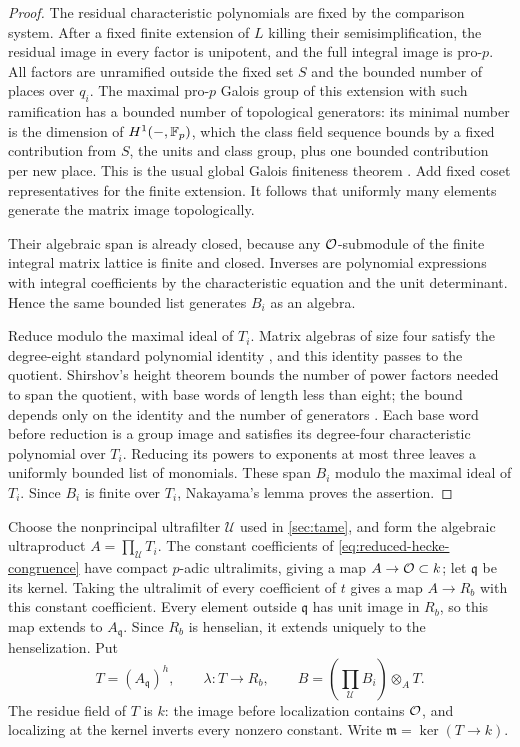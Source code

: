 \begin{proof}
The residual characteristic polynomials are fixed by the comparison
system.  After a fixed finite extension of $L$ killing their
semisimplification, the residual image in every factor is unipotent,
and the full integral image is pro-$p$.  All factors are unramified
outside the fixed set $S$ and the bounded number of places over
$q_i$.  The maximal pro-$p$ Galois group of this extension with such
ramification has a bounded number of topological generators: its
minimal number is the dimension of $H^1(-,\mathbb F_p)$, which the class
field sequence bounds by a fixed contribution from $S$, the units
and class group, plus one bounded contribution per new place.
This is the usual global Galois finiteness theorem
\citep[Chapter X]{NSW2008}.  Add fixed coset representatives for the
finite extension.  It follows that uniformly many elements generate
the matrix image topologically.

Their algebraic span is already closed, because any $\mathcal O$-submodule
of the finite integral matrix lattice is finite and closed.  Inverses
are polynomial expressions with integral coefficients by the
characteristic equation and the unit determinant.  Hence the same
bounded list generates $B_i$ as an algebra.

Reduce modulo the maximal ideal of $T_i$.  Matrix algebras of size
four satisfy the degree-eight standard polynomial identity
\citep{AmitsurLevitzki1950}, and this identity passes to the quotient.
Shirshov's height theorem bounds the number of power factors needed
to span the quotient, with base words of length less than eight;
the bound depends only on the identity and the number of generators
\citep[Section~2, Theorem~1 and its proof]{Shirshov1957}.
Each base word before reduction
is a group image and satisfies its degree-four characteristic
polynomial over $T_i$.  Reducing its powers to exponents at most
three leaves a uniformly bounded list of monomials.  These span
$B_i$ modulo the maximal ideal of $T_i$.  Since $B_i$ is finite over $T_i$,
Nakayama's lemma proves the assertion.
\end{proof}

Choose the nonprincipal ultrafilter $\mathcal U$ used in
\cref{sec:tame}, and form the algebraic ultraproduct
$A=\prod_{\mathcal U}T_i$.  The constant coefficients of
\cref{eq:reduced-hecke-congruence} have compact $p$-adic ultralimits,
giving a map $A\to\mathcal O\subset k$; let $\mathfrak q$ be its kernel.
Taking the ultralimit of every coefficient of $t$ gives a map
$A\to R_b$ with this constant coefficient.  Every element outside
$\mathfrak q$ has unit image in $R_b$, so this map extends to
$A_{\mathfrak q}$.  Since $R_b$ is henselian, it extends uniquely
to the henselization.  Put
\begin{equation}
 T=(A_{\mathfrak q})^h,\qquad
 \lambda:T\longrightarrow R_b,\qquad
 B=\left(\prod_{\mathcal U}B_i\right)\otimes_A T.
 \label{eq:limiting-algebras}
\end{equation}
The residue field of $T$ is $k$: the image before localization
contains $\mathcal O$, and localizing at the kernel inverts every nonzero
constant.
Write $\mathfrak m=\ker(T\to k)$.

